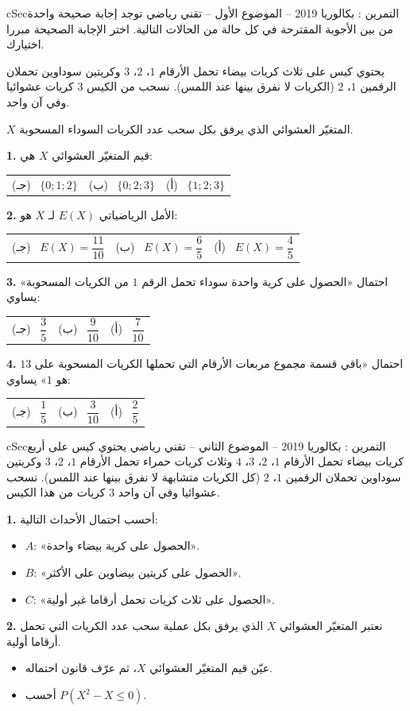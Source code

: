 \documentclass[12pt,a4paper]{article}
\newenvironment{BOX}[2]{\begin{otherlanguage}{english}\begin{arbox}{#1}{#2}}{\end{arbox}\end{otherlanguage}}
\newcounter{exo}
\newenvironment{tamrin}[1]{\stepcounter{exo}\begin{BOX}{cSec}{التمرين \theexo: #1}}{\end{BOX}}
\newenvironment{sq}{\begin{itemize}[leftmargin=2.4em,itemsep=3pt]}{\end{itemize}}
\newcommand{\qa}{\item[(أ)]}\newcommand{\qb}{\item[(ب)]}\newcommand{\qc}{\item[(جـ)]}\newcommand{\qd}{\item[(د)]}\newcommand{\qe}{\item[(هـ)]}
\newcommand{\QQ}[1]{\par\smallskip\textbf{#1.} }
\newcommand{\ABC}[3]{\\[2pt]\begin{tabular}{p{0.28\textwidth}p{0.28\textwidth}p{0.28\textwidth}}(جـ) \ #3 & (ب) \ #2 & (أ) \ #1\end{tabular}}
\begin{document}
\begin{tamrin}{بكالوريا 2019 -- الموضوع الأول -- تقني رياضي}
توجد إجابة صحيحة واحدة من بين الأجوبة المقترحة في كل حالة من الحالات التالية. اختر الإجابة الصحيحة مبررا اختيارك.

يحتوي كيس على ثلاث كريات بيضاء تحمل الأرقام $1$، $2$، $3$ وكريتين سوداوين تحملان الرقمين $1$، $2$ (الكريات لا نفرق بينها عند اللمس). نسحب من الكيس $3$ كريات عشوائيا وفي آن واحد.

$X$ المتغيّر العشوائي الذي يرفق بكل سحب عدد الكريات السوداء المسحوبة.
\QQ{1} قيم المتغيّر العشوائي $X$ هي:
\ABC{$\{1;2;3\}$}{$\{0;2;3\}$}{$\{0;1;2\}$}
\QQ{2} الأمل الرياضياتي $E(X)$ لـ $X$ هو:
\ABC{$E(X)=\dfrac45$}{$E(X)=\dfrac65$}{$E(X)=\dfrac{11}{10}$}
\QQ{3} احتمال «الحصول على كرية واحدة سوداء تحمل الرقم $1$ من الكريات المسحوبة» يساوي:
\ABC{$\dfrac{7}{10}$}{$\dfrac{9}{10}$}{$\dfrac35$}
\QQ{4} احتمال «باقي قسمة مجموع مربعات الأرقام التي تحملها الكريات المسحوبة على $13$ هو $1$» يساوي:
\ABC{$\dfrac25$}{$\dfrac{3}{10}$}{$\dfrac15$}
\end{tamrin}

\begin{tamrin}{بكالوريا 2019 -- الموضوع الثاني -- تقني رياضي}
يحتوي كيس على أربع كريات بيضاء تحمل الأرقام $1$، $2$، $3$، $4$ وثلاث كريات حمراء تحمل الأرقام $1$، $2$، $3$ وكريتين سوداوين تحملان الرقمين $1$، $2$ (كل الكريات متشابهة لا نفرق بينها عند اللمس). نسحب عشوائيا وفي آن واحد $3$ كريات من هذا الكيس.
\QQ{1} أحسب احتمال الأحداث التالية:
\begin{itemize}
\item $A$: «الحصول على كرية بيضاء واحدة».
\item $B$: «الحصول على كريتين بيضاوين على الأكثر».
\item $C$: «الحصول على ثلاث كريات تحمل أرقاما غير أولية».
\end{itemize}
\QQ{2} نعتبر المتغيّر العشوائي $X$ الذي يرفق بكل عملية سحب عدد الكريات التي تحمل أرقاما أولية.
\begin{sq}
\qa عيّن قيم المتغيّر العشوائي $X$، ثم عرّف قانون احتماله.
\qb أحسب $P(X^2-X\le0)$.
\end{sq}
\end{tamrin}
\end{document}
